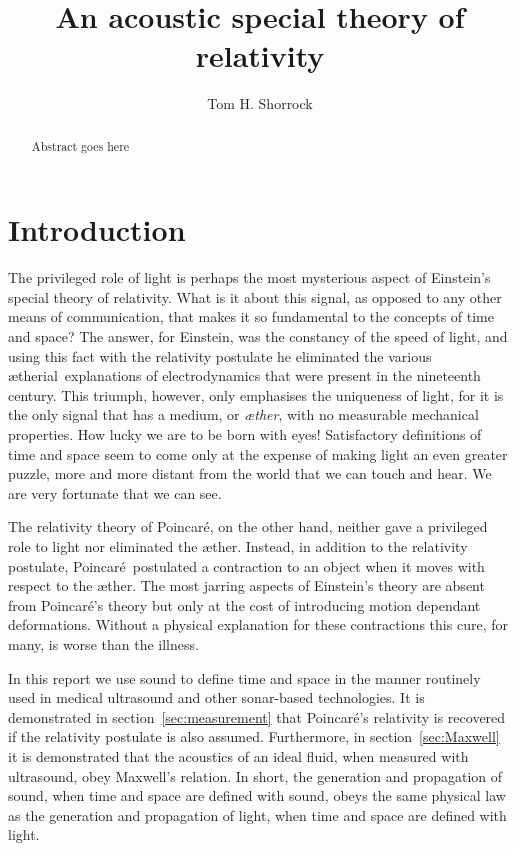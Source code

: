 \documentclass[10pt, fleqn,final,showtrims,oldfontcommands]{article} %
\title{An acoustic special theory of relativity}
\author{Tom H. Shorrock}
\newcommand{\aether}{\ae ther}
\newcommand{\aetherial}{\ae therial}
\newcommand{\Poincare}{Poincar{\'e}}
\begin{document}
\maketitle
\begin{abstract}
Abstract goes here
\end{abstract}

\section{Introduction}\label{sec:introduction}

The privileged role of light is perhaps the most mysterious aspect of Einstein's special theory of relativity.
What is it about this signal, as opposed to any other means of communication, that makes it  so fundamental to the  concepts of time and space?
The answer, for Einstein, was the constancy of the speed of light,
and using this fact with the relativity postulate he eliminated the  various \aetherial\ explanations of electrodynamics that were present in the nineteenth century.
This triumph, however, only emphasises the uniqueness of light, for it is the  only  signal that has a  medium, or {\em \aether}, with no measurable mechanical properties.
How lucky we are to be born with eyes! %
Satisfactory definitions of time and space seem to come only at the expense of making light  an even greater puzzle,
more and more distant from the world that we can touch and hear.
We are very fortunate that we can see.

The relativity theory of \Poincare, on the other hand,  neither gave a privileged role to light nor eliminated the \aether.
Instead, in addition to the relativity postulate, \Poincare\ postulated a  contraction to an object  when it moves with respect to the \aether.
The most jarring aspects of Einstein's theory are absent from \Poincare's theory but only at the cost of introducing motion dependant deformations.
Without a  physical explanation for these contractions
this cure, for many, is worse than the illness.

In this report we use sound to define time and space 
in the manner  routinely used in medical ultrasound and other sonar-based technologies.
It is demonstrated in section~\ref{sec:measurement} that \Poincare's relativity is recovered if the relativity postulate is also assumed.
Furthermore, in section~\ref{sec:Maxwell} it is demonstrated that the acoustics of an ideal fluid, when measured with ultrasound, 
obey Maxwell's relation.
In short, the generation and propagation of sound,  when time and space are defined with  sound,
obeys the same physical law as the generation and propagation of light,  when time and space are defined with light.
\end{document}
